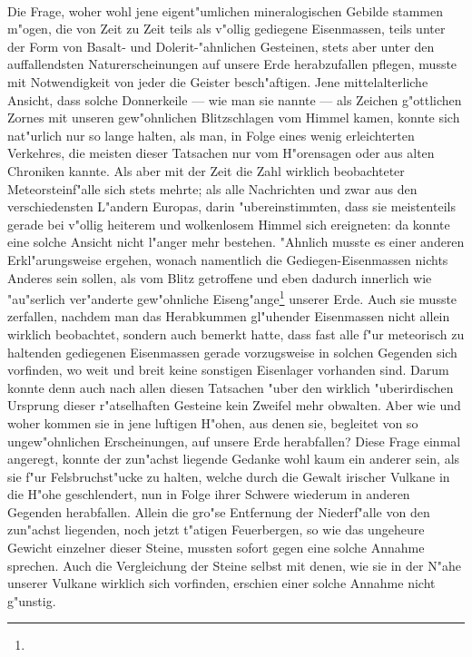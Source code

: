 \documentclass[a4paper, 8pt, oneside, polutonikogreek, german]{article}
\begin{document}
\paragraph{}
Die Frage, woher wohl jene eigent"umlichen mineralogischen Gebilde stammen m"ogen, die von Zeit zu Zeit teils als v"ollig gediegene Eisenmassen, teils unter der Form von Basalt- und Dolerit-"ahnlichen Gesteinen, stets aber unter den auffallendsten Naturerscheinungen auf unsere Erde herabzufallen pflegen, musste mit Notwendigkeit von jeder die Geister besch"aftigen. Jene mittelalterliche Ansicht, dass solche Donnerkeile — wie man sie nannte — als Zeichen g"ottlichen Zornes mit unseren gew"ohnlichen Blitzschlagen vom Himmel kamen, konnte sich nat"urlich nur so lange halten, als man, in Folge eines wenig erleichterten Verkehres, die meisten dieser Tatsachen nur vom H"orensagen oder aus alten Chroniken kannte. Als aber mit der Zeit die Zahl wirklich beobachteter Meteorsteinf"alle sich stets mehrte; als alle Nachrichten und zwar aus den verschiedensten L"andern Europas, darin "ubereinstimmten, dass sie meistenteils gerade bei v"ollig heiterem und wolkenlosem Himmel sich ereigneten: da konnte eine solche Ansicht nicht l"anger mehr bestehen. "Ahnlich musste es einer anderen Erkl"arungsweise ergehen, wonach namentlich die Gediegen-Eisenmassen nichts Anderes sein sollen, als vom Blitz getroffene und eben dadurch innerlich wie "au"serlich ver"anderte gew"ohnliche Eiseng"ange\footnote{} unserer Erde. Auch sie musste zerfallen, nachdem man das Herabkummen gl"uhender Eisenmassen nicht allein wirklich beobachtet, sondern auch bemerkt hatte, dass fast alle f"ur meteorisch zu haltenden gediegenen Eisenmassen gerade vorzugsweise in solchen Gegenden sich vorfinden, wo weit und breit keine sonstigen Eisenlager vorhanden sind. Darum konnte denn auch nach allen diesen Tatsachen "uber den wirklich "uberirdischen Ursprung dieser r"atselhaften Gesteine kein Zweifel mehr obwalten. Aber wie und woher kommen sie in jene luftigen H"ohen, aus denen sie, begleitet von so ungew"ohnlichen Erscheinungen, auf unsere Erde herabfallen? Diese Frage einmal angeregt, konnte der zun"achst liegende Gedanke wohl kaum ein anderer sein, als sie f"ur Felsbruchst"ucke zu halten, welche durch die Gewalt irischer Vulkane in die H"ohe geschlendert, nun in Folge ihrer Schwere wiederum in anderen Gegenden herabfallen. Allein die gro"se Entfernung der Niederf"alle von den zun"achst liegenden, noch jetzt t"atigen Feuerbergen, so wie das ungeheure Gewicht einzelner dieser Steine, mussten sofort gegen eine solche Annahme sprechen. Auch die Vergleichung der Steine selbst mit denen, wie sie in der N"ahe unserer Vulkane wirklich sich vorfinden, erschien einer solche Annahme nicht g"unstig.
\end{document}
